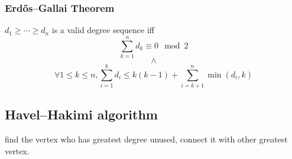 \subsubsection{Erdős–Gallai Theorem}
$d_1 \geq \cdots \geq d_n$ is a valid degree sequence iff
$$
\sum_{k=1}^{n} d_k \equiv 0 \mod{2} 
$$
$$
\land
$$
$$
\forall 1 \leq k \leq n, \sum^{k}_{i=1}d_i\leq k(k-1)+ \sum^n_{i=k+1} \min (d_i,k)
$$
\subsection{Havel–Hakimi algorithm}
find the vertex who has greatest degree unused, connect it with other greatest vertex.